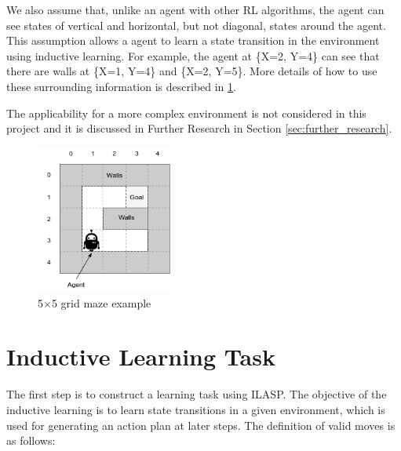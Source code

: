 We also assume that, unlike an agent with other RL algorithms, the agent can see states of vertical and horizontal, but not diagonal, states around the agent. 
This assumption allows a agent to learn a state transition in the environment using inductive learning. For example, the agent at \{X=2, Y=4\} can see that there are walls at \{X=1, Y=4\} and \{X=2, Y=5\}.
More details of how to use these surrounding information is described in \ref{sec:inductive_learning_task}.

The applicability for a more complex environment is not considered in this project and it is discussed in Further Research in Section \ref{sec:further_research}.

\begin{figure}[!htb]
\centering
\includegraphics[width=0.4\textwidth]{./figures/environment_example}
\caption{5$\times$5 grid maze example}
\label{environment_example}
\end{figure}

\section{Inductive Learning Task}
\label{sec:inductive_learning_task}
The first step is to construct a learning task using ILASP. The objective of the inductive learning is to learn state transitions in a given environment, which is used for generating an action plan at later steps.
The definition of valid moves is as follows:

